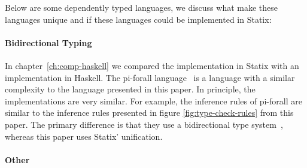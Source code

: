 Below are some dependently typed languages, we discuss what make these languages unique and if these languages could be implemented in Statix: 

\paragraph{Bidirectional Typing}

In chapter~\ref{ch:comp-haskell} we compared the implementation in Statix with an implementation in Haskell. The pi-forall language~\cite{pi_forall} is a language with a similar complexity to the language presented in this paper. In principle, the implementations are very similar. For example, the inference rules of pi-forall are similar to the inference rules presented in figure \ref{fig:type-check-rules} from this paper. The primary difference is that they use a bidirectional type system~\cite{bidirectional}, whereas this paper uses Statix' unification.

\paragraph{Other}